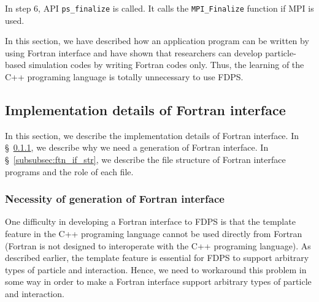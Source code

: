 \documentclass[twocolumn,useamsfonts]{pasj01}
\begin{document}
In step 6, API \texttt{ps\_finalize} is called. It calls the \texttt{MPI\_Finalize} function if MPI is used.

In this section, we have described how an application program can be written by using Fortran interface and have shown that researchers can develop particle-based simulation codes by writing Fortran codes only. Thus, the learning of the C++ programing language is totally unnecessary to use FDPS. 

\subsection{Implementation details of Fortran interface}
\label{subsec:ftn_if_impl}
In this section, we describe the implementation details of Fortran interface. In \S~\ref{subsubsec:ftn_if_gen}, we describe why we need a generation of Fortran interface. In \S~\ref{subsubsec:ftn_if_str}, we describe the file structure of Fortran interface programs and the role of each file.

\subsubsection{Necessity of generation of Fortran interface}
\label{subsubsec:ftn_if_gen}
One difficulty in developing a Fortran interface to FDPS is that the template feature in the C++ programing language cannot be used directly from Fortran (Fortran is not designed to interoperate with the C++ programing language). As described earlier, the template feature is essential for FDPS to support arbitrary types of particle and interaction. Hence, we need to workaround this problem in some way in order to make a Fortran interface support arbitrary types of particle and interaction.
\end{document}
